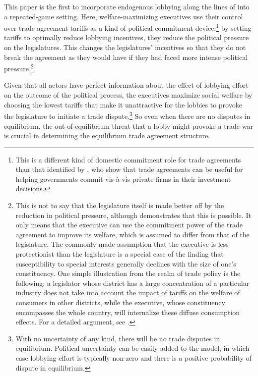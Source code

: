 \documentclass[authoryear, review]{elsarticle}
\begin{document}
This paper is the first to incorporate endogenous lobbying along the lines of \citet{gh94,gh95} into a repeated-game setting. Here, welfare-maximizing executives use their control over trade-agreement tariffs as a kind of political commitment device:\footnote{This is a different kind of domestic commitment role for trade agreements than that identified by \citet{mrc2007}, who show that trade agreements can be useful for helping governments commit vis-\`{a}-vis private firms in their investment decisions.} by setting tariffs to optimally reduce lobbying incentives, they reduce the political pressure on the legislatures. This changes the legislatures' incentives so that they do not break the agreement as they would have if they had faced more intense political pressure.\footnote{This is not to say that the legislature itself is made better off by the reduction in political pressure, although \citet{buzard2014} demonstrates that this is possible. It only means that the executive can use the commitment power of the trade agreement to improve its welfare, which is assumed to differ from that of the legislature. The commonly-made assumption that the executive is less protectionist than the legislature is a special case of the finding that susceptibility to special interests generally declines with the size of one's constituency. One simple illustration from the realm of trade policy is the following: a legislator whose district has a large concentration of a particular industry does not take into account the impact of tariffs on the welfare of consumers in other districts, while the executive, whose constituency encompasses the whole country, will internalize these diffuse consumption effects. For a detailed argument, see \citet{lohohal}.\label{fn:ga_l_e3}}

Given that all actors have perfect information about the effect of lobbying effort on the outcome of the political process, the executives maximize social welfare by choosing the lowest tariffs that make it unattractive for the lobbies to provoke the legislature to initiate a trade dispute.\footnote{With no uncertainty of any kind, there will be no trade disputes in equilibrium. Political uncertainty can be easily added to the model, in which case lobbying effort is typically non-zero and there is a positive probability of dispute in equilibrium.} So even when there are no disputes in equilibrium, the out-of-equilibrium threat that a lobby might provoke a trade war is crucial in determining the equilibrium trade agreement structure.
\end{document}
